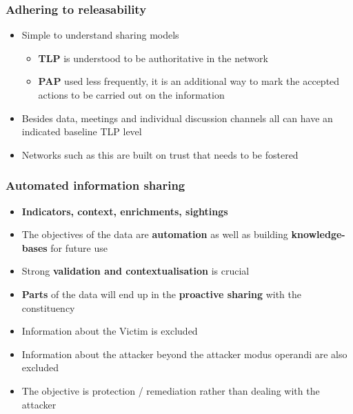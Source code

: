 \begin{frame}
    \frametitle{Adhering to releasability}
    \begin{itemize}
        \item Simple to understand sharing models
        \begin{itemize}
            \item {\bf TLP} is understood to be authoritative in the network
            \item {\bf PAP} used less frequently, it is an additional way to mark the accepted actions to be carried out on the information
        \end{itemize}
        \item Besides data, meetings and individual discussion channels all can have an indicated baseline TLP level
        \item Networks such as this are built on trust that needs to be fostered
    \end{itemize}


\end{frame}

\begin{frame}
    \frametitle{Automated information sharing}
    \begin{itemize}
        \item {\bf Indicators, context, enrichments, sightings}
        \item The objectives of the data are {\bf automation} as well as building {\bf knowledge-bases} for future use
        \item Strong {\bf validation and contextualisation} is crucial
        \item {\bf Parts} of the data will end up in the {\bf proactive sharing} with the constituency
        \item Information about the Victim is excluded
        \item Information about the attacker beyond the attacker modus operandi are also excluded
        \item The objective is protection / remediation rather than dealing with the attacker
    \end{itemize}

\end{frame}

